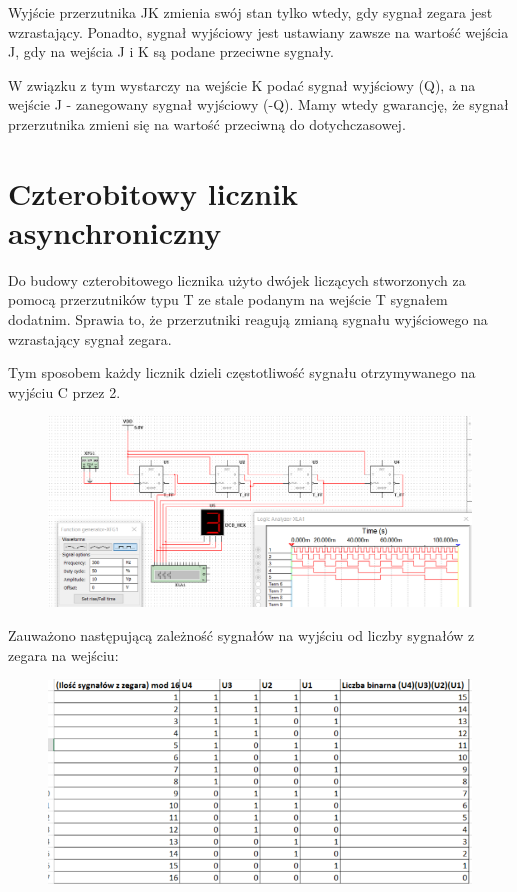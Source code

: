 \documentclass[12pt,a4paper]{article}
\begin{document}
Wyjście przerzutnika JK zmienia swój stan tylko wtedy, gdy sygnał zegara jest wzrastający. Ponadto, sygnał wyjściowy jest ustawiany zawsze na wartość wejścia J, gdy na wejścia J i K są podane przeciwne sygnały. 

W związku z tym wystarczy na wejście K podać sygnał wyjściowy (Q), a na wejście J - zanegowany sygnał wyjściowy (-Q). Mamy wtedy gwarancję, że sygnał przerzutnika zmieni się na wartość przeciwną do dotychczasowej.

\section{Czterobitowy licznik asynchroniczny}

Do budowy czterobitowego licznika użyto dwójek liczących stworzonych za pomocą przerzutników typu T ze stale podanym na wejście T sygnałem dodatnim. Sprawia to, że przerzutniki reagują zmianą sygnału wyjściowego na wzrastający sygnał zegara.
\par
Tym sposobem każdy licznik dzieli częstotliwość sygnału otrzymywanego na wyjściu C przez 2. 

\begin{figure}[H]
\centering
\includegraphics[width=\textwidth]{img/4b_wzrost}
\end{figure}

Zauważono następującą zależność sygnałów na wyjściu od liczby sygnałów z zegara na wejściu:

\begin{figure}[H]
\centering
\includegraphics[width=\textwidth]{img/4b_wzrost_table}
\end{figure}
\end{document}

